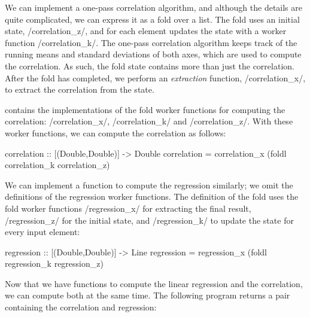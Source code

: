 
We can implement a one-pass correlation algorithm, and although the details are quite complicated, we can express it as a fold over a list.
The fold uses an initial state, \Hs/correlation_z/, and for each element updates the state with a worker function \Hs/correlation_k/.
The one-pass correlation algorithm keeps track of the running means and standard deviations of both axes, which are used to compute the correlation.
As such, the fold state contains more than just the correlation.
After the fold has completed, we perform an \emph{extraction} function, \Hs/correlation_x/, to extract the correlation from the state.

 contains the implementations of the fold worker functions for computing the correlation: \Hs/correlation_x/, \Hs/correlation_k/ and \Hs/correlation_z/.
With these worker functions, we can compute the correlation as follows:

\begin{haskell}
correlation :: [(Double,Double)] -> Double
correlation = correlation_x (foldl correlation_k correlation_z)
\end{haskell}


We can implement a function to compute the regression similarly; we omit the definitions of the regression worker functions.
The definition of the fold uses the fold worker functions \Hs/regression_x/ for extracting the final result, \Hs/regression_z/ for the initial state, and \Hs/regression_k/ to update the state for every input element:

\begin{haskell}
regression :: [(Double,Double)] -> Line
regression = regression_x (foldl regression_k regression_z)
\end{haskell}

Now that we have functions to compute the linear regression and the correlation, we can compute both at the same time.
The following program returns a pair containing the correlation and regression:
\newpage

